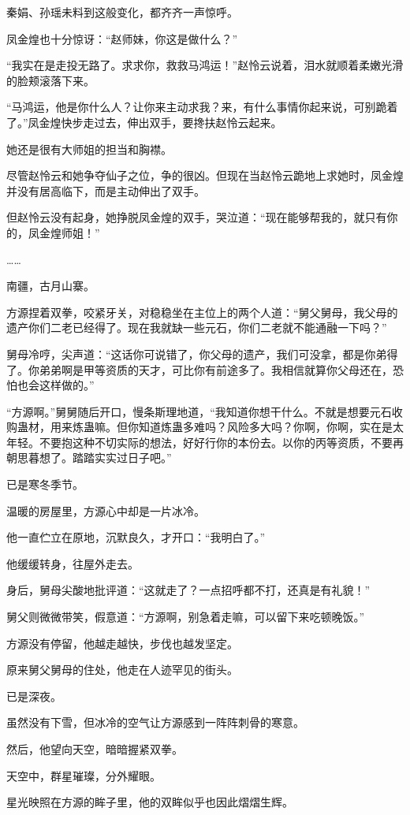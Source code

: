 \begin{this_body}
秦娟、孙瑶未料到这般变化，都齐齐一声惊呼。

凤金煌也十分惊讶：“赵师妹，你这是做什么？”

“我实在是走投无路了。求求你，救救马鸿运！”赵怜云说着，泪水就顺着柔嫩光滑的脸颊滚落下来。

“马鸿运，他是你什么人？让你来主动求我？来，有什么事情你起来说，可别跪着了。”凤金煌快步走过去，伸出双手，要搀扶赵怜云起来。

她还是很有大师姐的担当和胸襟。

尽管赵怜云和她争夺仙子之位，争的很凶。但现在当赵怜云跪地上求她时，凤金煌并没有居高临下，而是主动伸出了双手。

但赵怜云没有起身，她挣脱凤金煌的双手，哭泣道：“现在能够帮我的，就只有你的，凤金煌师姐！”

……

南疆，古月山寨。

方源捏着双拳，咬紧牙关，对稳稳坐在主位上的两个人道：“舅父舅母，我父母的遗产你们二老已经得了。现在我就缺一些元石，你们二老就不能通融一下吗？”

舅母冷哼，尖声道：“这话你可说错了，你父母的遗产，我们可没拿，都是你弟得了。你弟弟啊是甲等资质的天才，可比你有前途多了。我相信就算你父母还在，恐怕也会这样做的。”

“方源啊。”舅舅随后开口，慢条斯理地道，“我知道你想干什么。不就是想要元石收购蛊材，用来炼蛊嘛。但你知道炼蛊多难吗？风险多大吗？你啊，你啊，实在是太年轻。不要抱这种不切实际的想法，好好行你的本份去。以你的丙等资质，不要再朝思暮想了。踏踏实实过日子吧。”

已是寒冬季节。

温暖的房屋里，方源心中却是一片冰冷。

他一直伫立在原地，沉默良久，才开口：“我明白了。”

他缓缓转身，往屋外走去。

身后，舅母尖酸地批评道：“这就走了？一点招呼都不打，还真是有礼貌！”

舅父则微微带笑，假意道：“方源啊，别急着走嘛，可以留下来吃顿晚饭。”

方源没有停留，他越走越快，步伐也越发坚定。

原来舅父舅母的住处，他走在人迹罕见的街头。

已是深夜。

虽然没有下雪，但冰冷的空气让方源感到一阵阵刺骨的寒意。

然后，他望向天空，暗暗握紧双拳。

天空中，群星璀璨，分外耀眼。

星光映照在方源的眸子里，他的双眸似乎也因此熠熠生辉。


\end{this_body}
